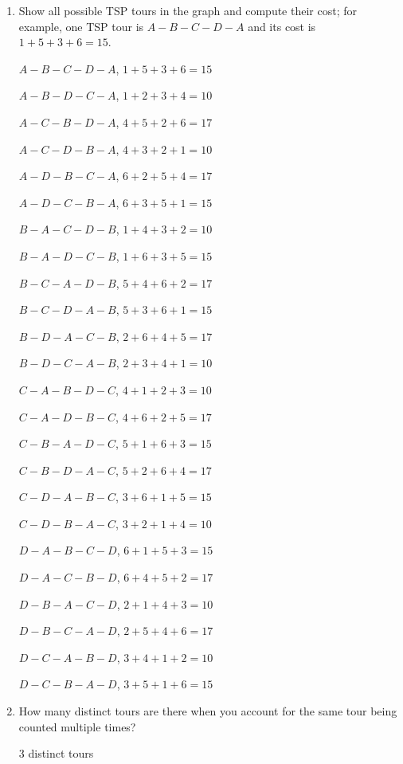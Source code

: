 \documentclass[12pt]{article}
\begin{document}
\begin{enumerate}
\item Show all possible TSP tours in the graph and compute 
their cost; for example, one TSP tour is $A - B - C - D - A$ 
and its cost is  $1 + 5 + 3 + 6 = 15$.

$A - B - C - D - A$, $1 + 5 + 3 + 6 = 15$

$A - B - D - C - A$, $1 + 2 + 3 + 4 = 10$

$A - C - B - D - A$, $4 + 5 + 2 + 6 = 17$

$A - C - D - B - A$, $4 + 3 + 2 + 1 = 10$

$A - D - B - C - A$, $6 + 2 + 5 + 4 = 17$

$A - D - C - B - A$, $6 + 3 + 5 + 1 = 15$

$B - A - C - D - B$, $1 + 4 + 3 + 2 = 10$

$B - A - D - C - B$, $1 + 6 + 3 + 5 = 15$

$B - C - A - D - B$, $5 + 4 + 6 + 2 = 17$

$B - C - D - A - B$, $5 + 3 + 6 + 1 = 15$

$B - D - A - C - B$, $2 + 6 + 4 + 5 = 17$

$B - D - C - A - B$, $2 + 3 + 4 + 1 = 10$

$C - A - B - D - C$, $4 + 1 + 2 + 3 = 10$

$C - A - D - B - C$, $4 + 6 + 2 + 5 = 17$

$C - B - A - D - C$, $5 + 1 + 6 + 3 = 15$

$C - B - D - A - C$, $5 + 2 + 6 + 4 = 17$

$C - D - A - B - C$, $3 + 6 + 1 + 5 = 15$

$C - D - B - A - C$, $3 + 2 + 1 + 4 = 10$

$D - A - B - C - D$, $6 + 1 + 5 + 3 = 15$

$D - A - C - B - D$, $6 + 4 + 5 + 2 = 17$

$D - B - A - C - D$, $2 + 1 + 4 + 3 = 10$

$D - B - C - A - D$, $2 + 5 + 4 + 6 = 17$

$D - C - A - B - D$, $3 + 4 + 1 + 2 = 10$

$D - C - B - A - D$, $3 + 5 + 1 + 6 = 15$

\vspace*{2in}

\item How many distinct tours are there when you account for the same tour
being counted multiple times?

3 distinct tours

\end{enumerate}
\end{document}
